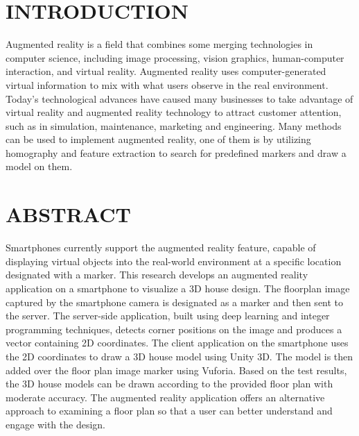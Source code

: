 \documentclass[12pt]{article}
\begin{document}
\tableofcontents
\pagestyle{fancy}
\fancyhead{} %
\fancyfoot{} %

\section{\uppercase{\large{Introduction}}}
Augmented reality is a field that combines some merging technologies in computer science, including image processing, vision graphics, human-computer interaction, and virtual reality. Augmented reality uses computer-generated virtual information to mix with what users observe in the real environment. Today’s technological advances have caused many businesses to take advantage of virtual reality and augmented reality technology to attract customer attention, such as in simulation, maintenance, marketing and engineering. Many methods can be used to implement augmented reality, one of them is by utilizing homography and feature extraction to search for predefined markers and draw a model on them.

\section{\uppercase{\large{Abstract}}}
Smartphones currently support the augmented reality feature, capable of displaying virtual objects into the real-world environment at a specific location designated with a marker. This research develops an augmented reality application on a smartphone to visualize a 3D house design. The floorplan image captured by the smartphone camera is designated as a marker and then sent to the server. The server-side application, built using deep learning and integer programming techniques, detects corner positions on the image and produces a vector containing 2D coordinates. The client application on the smartphone uses the 2D coordinates to draw a 3D house model using Unity 3D. The model is then added over the floor plan image marker using Vuforia. Based on the test results, the 3D house models can be drawn according to the provided floor plan with moderate accuracy. The augmented reality application offers an alternative approach to examining a floor plan so that a user can better understand and engage with the design.
\end{document}
